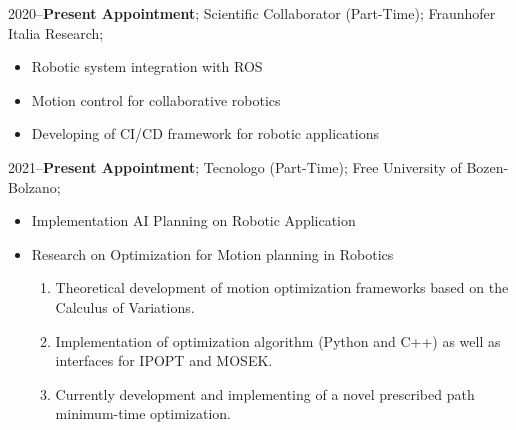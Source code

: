 \addwork%
{%
    2020--\textbf{Present Appointment};%
    Scientific Collaborator (Part-Time);%
    Fraunhofer Italia Research;%
    \begin{itemize}
        \item Robotic system integration with ROS
        \item Motion control for collaborative robotics
        \item Developing of CI/CD framework for robotic applications
    \end{itemize}
}%

\addwork%
{%
    2021--\textbf{Present Appointment};%
    Tecnologo (Part-Time);%
    Free University of Bozen-Bolzano;%
    \begin{itemize}
        \item Implementation AI Planning on Robotic Application
        \item Research on Optimization for Motion planning in Robotics
            \ifdefined\extended
                \begin{enumerate}
                    \item Theoretical development of motion optimization frameworks based on the Calculus of Variations.
                    \item Implementation of optimization algorithm (Python and C++) as well as interfaces for IPOPT and MOSEK.
                    \item Currently development and implementing of a novel prescribed path minimum-time optimization.
                \end{enumerate}
            \fi
    \end{itemize}
}%

